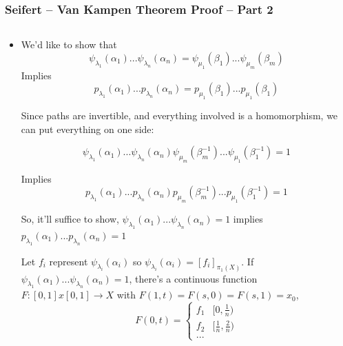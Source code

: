 \documentclass[8pt]{beamer}
\begin{document}
  \begin{frame}
    \frametitle{Seifert -- Van Kampen Theorem Proof -- Part 2}
    \begin{columns}
      \begin{column}[T]{0.5\textwidth}
        \begin{itemize}
          \item We'd like to show that
              \[\psi_{\lambda_1}(\alpha_1) ... \psi_{\lambda_n}
            (\alpha_n) = \psi_{\mu_1}(\beta_1) ... \psi_{\mu_m}(\beta_m)\]
            Implies
             \[p_{\lambda_1}(\alpha_1) ... p_{\lambda_n}(\alpha_n) =
              p_{\mu_1}(\beta_1) ... p_{\mu_1}(\beta_1) \]

            Since paths are invertible, and everything involved is a homomorphism,
            we can put everything on one side:

            \[\psi_{\lambda_1}(\alpha_1) ... \psi_{\lambda_n}(\alpha_n)
              \psi_{\mu_m}(\beta_m^{-1}) ... \psi_{\mu_1}(\beta_1^{-1}) = 1\]

            Implies
              \[p_{\lambda_1}(\alpha_1) ... p_{\lambda_n}(\alpha_n)
              p_{\mu_m}(\beta_m^{-1}) ... p_{\mu_1}(\beta_1^{-1}) = 1\]

            So, it'll suffice to show,
            $\psi_{\lambda_1}(\alpha_1) ... \psi_{\lambda_n}(\alpha_n) = 1$ implies
            $p_{\lambda_1}(\alpha_1) ... p_{\lambda_n}(\alpha_n) = 1$

            Let $f_i$ represent $\psi_{\lambda_i}(\alpha_i)$ so
            $\psi_{\lambda_i}(\alpha_i) = [f_i]_{\pi_1(X)}$.
            If $\psi_{\lambda_1}(\alpha_1) ... \psi_{\lambda_n}(\alpha_n) = 1$,
            there's a continuous function $F : [0,1]x[0,1] \rightarrow X$ with
            $F(1,t) = F(s,0) = F(s,1) = x_0$,
            \[F(0,t) = \begin{cases} f_1 & [0,\frac{1}{n}) \\ f_2 & [\frac{1}{n}, \frac{2}{n}) \\ ... \end{cases}\]


\end{itemize}
\end{column}
\end{columns}
\end{frame}
\end{document}

